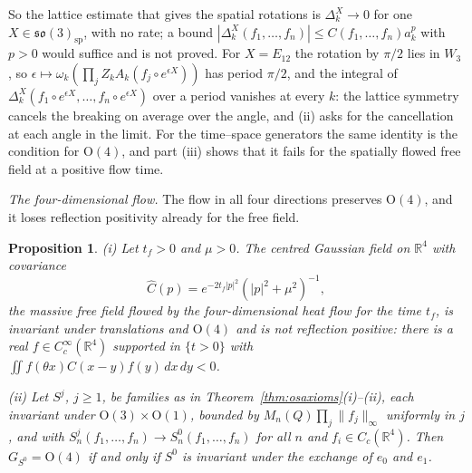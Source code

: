 \documentclass[aps,prd,twocolumn,superscriptaddress,nofootinbib,longbibliography,floatfix,amsmath,amssymb,10pt]{revtex4-2}
\newtheorem{proposition}[theorem]{Proposition}
\theoremstyle{definition}
\theoremstyle{remark}
\newcommand{\R}{\mathbb{R}}
\begin{document}
So the lattice estimate that gives the spatial rotations is
$\Delta^X_k\to0$ for one $X\in\mathfrak{so}(3)_{\mathrm{sp}}$, with no
rate; a bound $|\Delta^X_k(f_1,\dots,f_n)|\le C(f_1,\dots,f_n)a_k^p$ with
$p>0$ would suffice and is not proved. For $X=E_{12}$ the rotation by
$\pi/2$ lies in $W_3$, so $\epsilon\mapsto\omega_k(\prod_jZ_kA_k(f_j\circ
e^{\epsilon X}))$ has period $\pi/2$, and the integral of
$\Delta^X_k(f_1\circ e^{\epsilon X},\dots,f_n\circ e^{\epsilon X})$ over a
period vanishes at every $k$: the lattice symmetry cancels the breaking on
average over the angle, and (ii) asks for the cancellation at each angle
in the limit. For the time--space generators the same identity is the
condition for $\mathrm O(4)$, and part (iii) shows that it fails for the
spatially flowed free field at a positive flow time.

\emph{The four-dimensional flow.} The flow in all four directions
preserves $\mathrm O(4)$, and it loses reflection positivity already for
the free field.

\begin{proposition}\label{prop:fourflow}
\textup{(i)} Let $t_f>0$ and $\mu>0$. The centred Gaussian field on $\R^4$
with covariance
\[
\widehat C(p)=e^{-2t_f|p|^2}(|p|^2+\mu^2)^{-1},
\]
the massive free field flowed by the four-dimensional heat flow for the
time $t_f$, is invariant under translations and $\mathrm O(4)$ and is not
reflection positive: there is a real $f\in C^\infty_c(\R^4)$ supported in
$\{t>0\}$ with $\iint f(\theta x)C(x-y)f(y)\,dx\,dy<0$.

\textup{(ii)} Let $S^j$, $j\ge1$, be families as in
Theorem~\textup{\ref{thm:osaxioms}(i)--(ii)}, each invariant under
$\mathrm O(3)\times\mathrm O(1)$, bounded by $M_n(Q)\prod_j\|f_j\|_\infty$
uniformly in $j$, and with $S^j_n(f_1,\dots,f_n)\to S^0_n(f_1,\dots,f_n)$
for all $n$ and $f_i\in C_c(\R^4)$. Then $G_{S^0}=\mathrm O(4)$ if and
only if $S^0$ is invariant under the exchange of $e_0$ and $e_1$.
\end{proposition}
\end{document}
